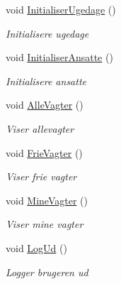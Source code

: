 \begin{DoxyCompactItemize}
void \hyperlink{class__1aarsproeve_1_1_view_model_1_1_vagtplan_view_model_ad4620a85449f88c843d594dfb7e2f5fa}{Initialiser\+Ugedage} ()
\begin{DoxyCompactList}\small\item\em Initialisere ugedage \end{DoxyCompactList}\item 
void \hyperlink{class__1aarsproeve_1_1_view_model_1_1_vagtplan_view_model_a5616979ee0bb0fe1904d965f2b688560}{Initialiser\+Ansatte} ()
\begin{DoxyCompactList}\small\item\em Initialisere ansatte \end{DoxyCompactList}\item 
void \hyperlink{class__1aarsproeve_1_1_view_model_1_1_vagtplan_view_model_a1e49e7514900058b5cd36e4991e08b23}{Alle\+Vagter} ()
\begin{DoxyCompactList}\small\item\em Viser allevagter \end{DoxyCompactList}\item 
void \hyperlink{class__1aarsproeve_1_1_view_model_1_1_vagtplan_view_model_aac01e39a92807c54f6718d4be4aeabc2}{Frie\+Vagter} ()
\begin{DoxyCompactList}\small\item\em Viser frie vagter \end{DoxyCompactList}\item 
void \hyperlink{class__1aarsproeve_1_1_view_model_1_1_vagtplan_view_model_a94fda6c42d4819fa2af8af5e2c22eff1}{Mine\+Vagter} ()
\begin{DoxyCompactList}\small\item\em Viser mine vagter \end{DoxyCompactList}\item 
void \hyperlink{class__1aarsproeve_1_1_view_model_1_1_vagtplan_view_model_a543ec6d690130a11d074bc58ba9f1552}{Log\+Ud} ()
\begin{DoxyCompactList}\small\item\em Logger brugeren ud \end{DoxyCompactList}\end{DoxyCompactItemize}
